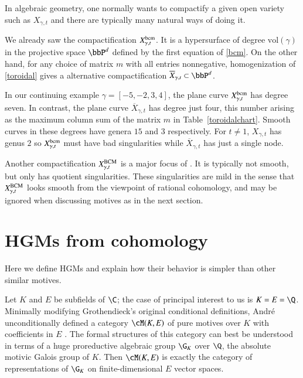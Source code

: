 \documentclass{notices}
\numberwithin{equation}{section}
\numberwithin{table}{section}
\numberwithin{figure}{section}
\begin{document}
{   In algebraic geometry, one normally wants
  to compactify a given open variety such as $X_{\gamma,t}$ and there
  are typically many natural ways of doing it.  

  We already saw the compactification $X_{\gamma,t}^{\rm bcm}$.  It is
  a hypersurface of degree $\mbox{vol}(\gamma)$ in the projective
  space $\bbP^{d}$ defined by the first equation of \eqref{bcm}.  On
  the other hand, for any choice of matrix $m$ with all entries
  nonnegative, homogenization of \eqref{toroidal} gives a
  alternative compactification
  $\overline{X}_{\gamma,t} \subset \bbP^d$.
  
  In our continuing example $\gamma = [-5,-2,3,4]$, the plane curve
  $X_{\gamma,t}^{\rm bcm}$ has degree seven.  In contrast, the plane
  curve $\overline{X}_{\gamma,t}$ has degree just four, this number
  arising as the maximum column sum of the matrix $m$ in
  Table~\ref{toroidalchart}.  Smooth curves in these degrees have
  genera $15$ and $3$ respectively.  For $t \neq 1$, $X_{\gamma,t}$
  has genus $2$ so $X_{\gamma,t}^{\rm bcm}$ must have bad
  singularities while $\overline{X}_{\gamma,t}$ has just a single node.  
  
  Another compactification $X_{\gamma,t}^{\rm BCM}$ is a major focus
  of \cite{BCM}. It is typically not smooth, but only has quotient
  singularities.  These singularities are mild in
  the sense that $X_{\gamma,t}^{\rm BCM}$ looks smooth from the
  viewpoint of rational cohomology, and may be ignored when discussing
  motives as in the next section.  

\section{HGMs from cohomology}
\label{HGMs}
   Here we define HGMs and explain how their
 behavior is simpler than other similar motives.

  Let $K$ and $E$ be 
subfields of $\C$; the case of principal interest to us is $K=E=\Q$.
  Minimally modifying Grothendieck's original conditional definitions, 
Andr\'e unconditionally defined a category $\cM(K,E)$ of 
pure motives over $K$ with coefficients in $E$ \cite{And}.  
The formal structures of this category can best
be understood in terms of a huge proreductive
algebraic group $\G_K$ over $\Q$, the absolute motivic
Galois group of $K$.  Then $\cM(K,E)$ is exactly
the category of representations of $\G_K$ on
finite-dimensional $E$ vector spaces.  

}
\end{document}
